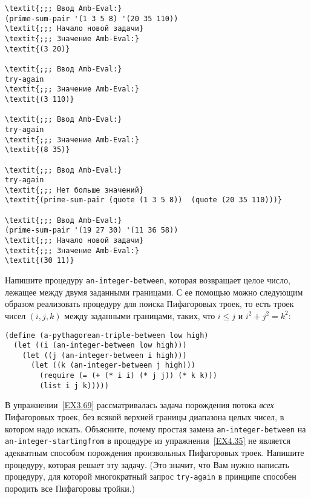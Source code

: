 \begin{Verbatim}[fontsize=\small]
\textit{;;; Ввод Amb-Eval:}
(prime-sum-pair '(1 3 5 8) '(20 35 110))
\textit{;;; Начало новой задачи}
\textit{;;; Значение Amb-Eval:}
\textit{(3 20)}

\textit{;;; Ввод Amb-Eval:}
try-again
\textit{;;; Значение Amb-Eval:}
\textit{(3 110)}

\textit{;;; Ввод Amb-Eval:}
try-again
\textit{;;; Значение Amb-Eval:}
\textit{(8 35)}

\textit{;;; Ввод Amb-Eval:}
try-again
\textit{;;; Нет больше значений}
\textit{(prime-sum-pair (quote (1 3 5 8))  (quote (20 35 110)))}

\textit{;;; Ввод Amb-Eval:}
(prime-sum-pair '(19 27 30) '(11 36 58))
\textit{;;; Начало новой задачи}
\textit{;;; Значение Amb-Eval:}
\textit{(30 11)}
\end{Verbatim}

\begin{exercise}{4.35}%
\label{EX4.35}%
Напишите процедуру {\tt an-integer-between},
которая возвращает целое число, лежащее между двумя заданными
границами.  С ее помощью можно следующим образом реализовать процедуру
для поиска Пифагоровых троек, то есть троек чисел $(i, j, k)$ 
между заданными границами, таких, что $i \leq j$ и 
$i^2 + j^2 = k^2$:

\begin{Verbatim}[fontsize=\small]
(define (a-pythagorean-triple-between low high)
  (let ((i (an-integer-between low high)))
    (let ((j (an-integer-between i high)))
      (let ((k (an-integer-between j high)))
        (require (= (+ (* i i) (* j j)) (* k k)))
        (list i j k)))))
\end{Verbatim}
\end{exercise}

\begin{exercise}{4.36}\label{EX4.36}%
В упражнении~\ref{EX3.69} рассматривалась
задача порождения потока {\em всех} Пифагоровых троек, без
всякой верхней границы диапазона целых чисел, в котором надо искать.
Объясните, почему простая замена {\tt an-integer-between} на
{\tt an-integer-starting\-from} в процедуре из %
упражнения~\ref{EX4.35} не является адекватным способом порождения
произвольных Пифагоровых троек.  Напишите процедуру, которая решает
эту задачу. (Это значит, что Вам нужно написать процедуру, для которой
многократный запрос {\tt try-again} в принципе способен
породить все Пифагоровы тройки.)
\end{exercise}

